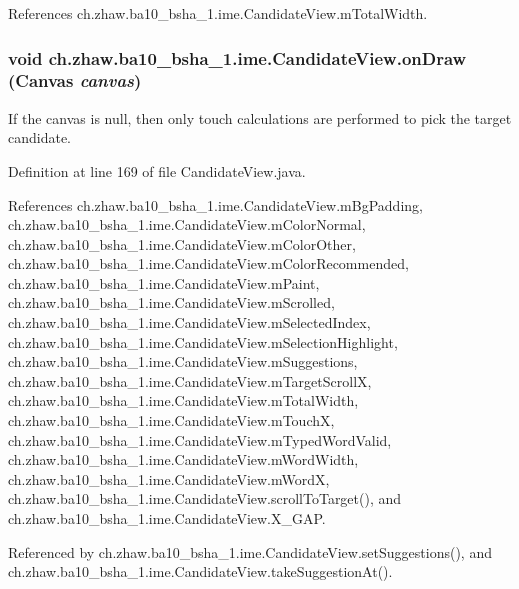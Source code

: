 References ch.zhaw.ba10\_\-bsha\_\-1.ime.CandidateView.mTotalWidth.\hypertarget{classch_1_1zhaw_1_1ba10__bsha__1_1_1ime_1_1CandidateView_a81383d3ca29122604138b340746eabe5}{
\subsubsection[{onDraw}]{\setlength{\rightskip}{0pt plus 5cm}void ch.zhaw.ba10\_\-bsha\_\-1.ime.CandidateView.onDraw (Canvas {\em canvas})}}
\label{classch_1_1zhaw_1_1ba10__bsha__1_1_1ime_1_1CandidateView_a81383d3ca29122604138b340746eabe5}
If the canvas is null, then only touch calculations are performed to pick the target candidate. 

Definition at line 169 of file CandidateView.java.

References ch.zhaw.ba10\_\-bsha\_\-1.ime.CandidateView.mBgPadding, ch.zhaw.ba10\_\-bsha\_\-1.ime.CandidateView.mColorNormal, ch.zhaw.ba10\_\-bsha\_\-1.ime.CandidateView.mColorOther, ch.zhaw.ba10\_\-bsha\_\-1.ime.CandidateView.mColorRecommended, ch.zhaw.ba10\_\-bsha\_\-1.ime.CandidateView.mPaint, ch.zhaw.ba10\_\-bsha\_\-1.ime.CandidateView.mScrolled, ch.zhaw.ba10\_\-bsha\_\-1.ime.CandidateView.mSelectedIndex, ch.zhaw.ba10\_\-bsha\_\-1.ime.CandidateView.mSelectionHighlight, ch.zhaw.ba10\_\-bsha\_\-1.ime.CandidateView.mSuggestions, ch.zhaw.ba10\_\-bsha\_\-1.ime.CandidateView.mTargetScrollX, ch.zhaw.ba10\_\-bsha\_\-1.ime.CandidateView.mTotalWidth, ch.zhaw.ba10\_\-bsha\_\-1.ime.CandidateView.mTouchX, ch.zhaw.ba10\_\-bsha\_\-1.ime.CandidateView.mTypedWordValid, ch.zhaw.ba10\_\-bsha\_\-1.ime.CandidateView.mWordWidth, ch.zhaw.ba10\_\-bsha\_\-1.ime.CandidateView.mWordX, ch.zhaw.ba10\_\-bsha\_\-1.ime.CandidateView.scrollToTarget(), and ch.zhaw.ba10\_\-bsha\_\-1.ime.CandidateView.X\_\-GAP.

Referenced by ch.zhaw.ba10\_\-bsha\_\-1.ime.CandidateView.setSuggestions(), and ch.zhaw.ba10\_\-bsha\_\-1.ime.CandidateView.takeSuggestionAt().


